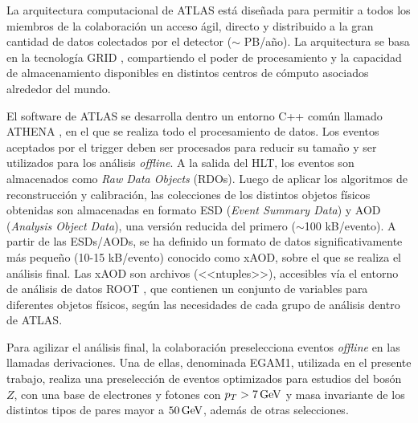 La arquitectura computacional de ATLAS está diseñada para permitir a todos los miembros de la colaboración un acceso ágil, directo y distribuido a la gran cantidad de datos colectados por el detector ($\sim$ PB/año). La arquitectura se basa en la tecnología GRID \cite{grid_web}, compartiendo el poder de procesamiento y la capacidad de almacenamiento disponibles en distintos centros de cómputo asociados alrededor del mundo.

El software de ATLAS se desarrolla dentro un entorno C++ común llamado ATHENA \cite{ATLASComputing, Lenzi:1214931, Calafiura:865624}, en el que se realiza todo el procesamiento de datos. Los eventos aceptados por el trigger deben ser procesados para reducir su tamaño y ser utilizados para los análisis \textit{offline}. A la salida del HLT, los eventos son almacenados como \textit{Raw Data Objects} (RDOs). Luego de aplicar los algoritmos de reconstrucción y calibración, las colecciones de los distintos objetos físicos obtenidas son almacenadas en formato ESD (\textit{Event Summary Data}) y AOD (\textit{Analysis Object Data}), una versión reducida del primero ($\sim$100 kB/evento). A partir de las ESDs/AODs, se ha definido un formato de datos significativamente más pequeño (10-15 kB/evento) conocido como xAOD, sobre el que se realiza el análisis final. Las xAOD son archivos (<<ntuples>>), accesibles vía el entorno de análisis de datos ROOT \cite{Brun:1997pa}, que contienen un conjunto de variables para diferentes objetos físicos, según las necesidades de cada grupo de análisis dentro de ATLAS. 

Para agilizar el análisis final, la colaboración preselecciona eventos \textit{offline} en las llamadas derivaciones. Una de ellas, denominada EGAM1, utilizada en el presente trabajo, realiza una preselección de eventos optimizados para estudios del bosón $Z$, con una base de electrones y fotones con $p_{T} > 7 \, \mathrm{GeV}$ y masa invariante de los distintos tipos de pares mayor a $50 \, \mathrm{GeV}$, además de otras selecciones.
